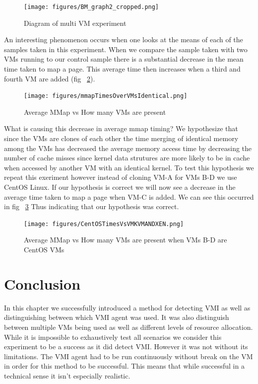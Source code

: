 	\begin{figure}[p!]\label{Fig4VMTest}
	  \centering
	  \texttt{[image: figures/BM\_graph2\_cropped.png]}
	  \caption{Diagram of multi VM experiment} 
	\end{figure}


An interesting phenomenon occurs when one looks at the means of each of the samples taken in this experiment. When we compare the sample taken with two VMs running to our control sample there is a substantial decrease in the mean time taken to map a page. This average time then increases when a third and fourth VM are added (fig ~\ref{Fig4VMTestUbuntu}).

	\begin{figure}[p!]\label{Fig4VMTestUbuntu}
		\centering
		\texttt{[image: figures/mmapTimesOverVMsIdentical.png]}
		\caption{Average MMap vs How many VMs are present}
	\end{figure}

What is causing this decrease in average mmap timing? We hypothesize that since the VMs are clones of each other the time merging of identical memory among the VMs has decreased the average memory access time by decreasing the number of cache misses since kernel data strutures are more likely to be in cache when accessed by another VM with an identical kernel. To test this hypothesis we repeat this exeriment however instead of cloning VM-A for VMs B-D we use CentOS Linux. If our hypothesis is correct we will now see a decrease in the average time taken to map a page when VM-C is added. We can see this occurred in fig ~\ref{Fig4VMTestCentOS} Thus indicating that our hypothesis was correct.

\begin{figure}[p!]\label{Fig4VMTestCentOS}
		\centering
		\texttt{[image: figures/CentOSTimesVsVMKVMANDXEN.png]}
		\caption{Average MMap vs How many VMs are present when VMs B-D are CentOS VMs}
	\end{figure}

 

\section{Conclusion}
In this chapter we successfully introduced a method for detecting VMI as well as distinguishing between which VMI agent was used. It was also distinguish between multiple VMs being used as well as different levels of resource allocation. While it is impossible to exhaustively test all scenarios we consider this experiment to be a success as it did detect VMI. However it was not without its limitations. The VMI agent had to be run continuously without break on the VM in order for this method to be successful. This means that while successful in a technical sense it isn't especially realistic. 